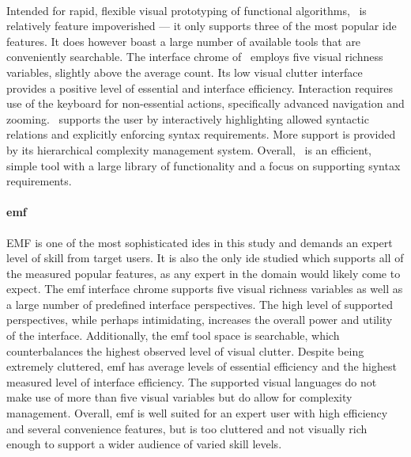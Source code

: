 \paragraph{\cameleon} Intended for rapid, flexible visual prototyping of
functional algorithms, \cameleon~is relatively feature impoverished --- it
only supports three of the most popular \ac{ide} features. It does however
boast a large number of available tools that are conveniently searchable.
The interface chrome of \cameleon~employs five visual richness variables,
slightly above the average count. Its low visual clutter interface provides
a positive level of essential and interface efficiency. Interaction
requires use of the keyboard for non-essential actions, specifically
advanced navigation and zooming. \cameleon~supports the user by
interactively highlighting allowed syntactic relations and explicitly
enforcing syntax requirements. More support is provided by its hierarchical
complexity management system. Overall, \cameleon~is an efficient, simple
tool with a large library of functionality and a focus on supporting syntax
requirements.

\paragraph{\acl{emf}} EMF is one of the most sophisticated
\acp{ide} in this study and demands an expert level of skill from target
users. It is also the only \ac{ide} studied which supports all of the
measured popular features, as any expert in the domain would likely come to
expect. The \ac{emf} interface chrome supports five visual richness
variables as well as a large number of predefined interface perspectives.
The high level of supported perspectives, while perhaps intimidating,
increases the overall power and utility of the interface. Additionally, the
\ac{emf} tool space is searchable, which counterbalances the highest
observed level of visual clutter. Despite being extremely cluttered,
\ac{emf} has average levels of essential efficiency and the highest
measured level of interface efficiency. The supported visual languages do
not make use of more than five visual variables but do allow for complexity
management. Overall, \ac{emf} is well suited for an expert user with high
efficiency and several convenience features, but is too cluttered and not
visually rich enough to support a wider audience of varied skill levels.

